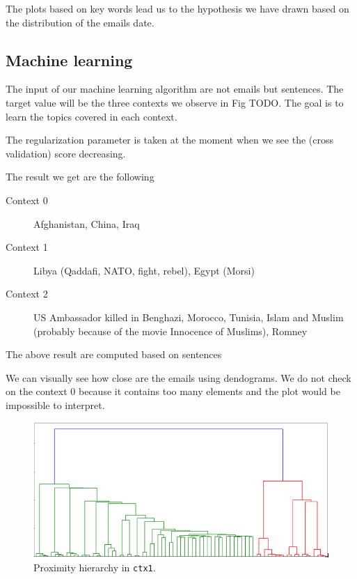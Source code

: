 \documentclass[11pt]{article}
\begin{document}
The plots based on key words lead us to the hypothesis we have drawn based on the distribution of the emails date.

\subsection{Machine learning}

The input of our machine learning algorithm are not emails but sentences. The target value will be the three contexts we observe in Fig TODO. The goal is to learn the topics covered in each context.

The regularization parameter is taken at the moment when we see the (cross validation) score decreasing.

The result we get are the following

\begin{description}
    \item[Context 0] Afghanistan, China, Iraq
    \item[Context 1] Libya (Qaddafi, NATO, fight, rebel), Egypt (Morsi)
    \item[Context 2] US Ambassador killed in Benghazi, Morocco, Tunisia, Islam and Muslim (probably because of the movie Innocence of Muslims), Romney
\end{description}

The above result are computed based on sentences

We can visually see how close are the emails using dendograms. We do not check on the context 0 because it contains too many elements and the plot would be impossible to interpret.

\begin{figure}[h]
	\centering
	\includegraphics[width=\linewidth]{images/dendogram_ctx1.png}
	\caption{Proximity hierarchy in \texttt{ctx1}.}
	\label{fig:dendogram_ctx1}
\end{figure}
\end{document}
